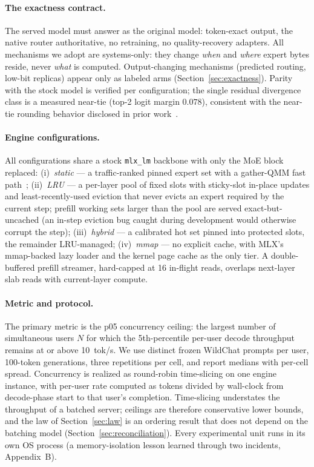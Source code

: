 \documentclass[11pt]{article}
\begin{document}
\paragraph{The exactness contract.}
The served model must answer as the original model: token-exact output, the
native router authoritative, no retraining, no quality-recovery adapters.
All mechanisms we adopt are systems-only: they change \emph{when} and
\emph{where} expert bytes reside, never \emph{what} is computed.
Output-changing mechanisms (predicted routing, low-bit replicas) appear
only as labeled arms (Section~\ref{sec:exactness}). Parity with the stock
model is verified per configuration; the single residual divergence class
is a measured near-tie (top-2 logit margin $0.078$), consistent with the
near-tie rounding behavior disclosed in prior work~\cite{hariri2026pinning}.

\paragraph{Engine configurations.}
All configurations share a stock \texttt{mlx\_lm} backbone with only the MoE
block replaced: (i)~\emph{static} --- a traffic-ranked pinned expert set
with a gather-QMM fast path~\cite{hariri2026pinning}; (ii)~\emph{LRU} --- a
per-layer pool of fixed slots with sticky-slot in-place updates and
least-recently-used eviction that never evicts an expert required by the
current step; prefill working sets larger than the pool are served
exact-but-uncached (an in-step eviction bug caught during development would
otherwise corrupt the step); (iii)~\emph{hybrid} --- a calibrated hot set
pinned into protected slots, the remainder LRU-managed; (iv)~\emph{mmap}
--- no explicit cache, with MLX's mmap-backed lazy loader and the kernel
page cache as the only tier. A double-buffered prefill streamer, hard-capped
at 16 in-flight reads, overlaps next-layer slab reads with current-layer
compute.

\paragraph{Metric and protocol.}
The primary metric is the p05 concurrency ceiling: the largest number of
simultaneous users $N$ for which the 5th-percentile per-user decode
throughput remains at or above \SI{10}{tok/s}. We use distinct frozen
WildChat prompts per user, 100-token generations, three repetitions per
cell, and report medians with per-cell spread. Concurrency is realized as
round-robin time-slicing on one engine instance, with per-user rate computed
as tokens divided by wall-clock from decode-phase start to that user's
completion. Time-slicing understates the throughput of a batched server;
ceilings are therefore conservative lower bounds, and the law of
Section~\ref{sec:law} is an ordering result that does not depend on the
batching model (Section~\ref{sec:reconciliation}). Every experimental unit
runs in its own OS process (a memory-isolation lesson learned through two
incidents, Appendix~B).
\end{document}
